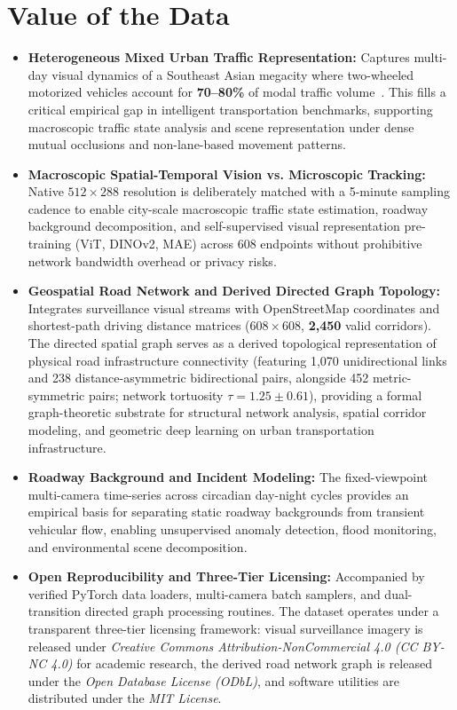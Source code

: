 \documentclass[preprint,12pt]{elsarticle}
\begin{document}
\clearpage

\clearpage

\section{Value of the Data}
\begin{itemize}
    \item \textbf{Heterogeneous Mixed Urban Traffic Representation:} Captures multi-day visual dynamics of a Southeast Asian megacity where two-wheeled motorized vehicles account for \textbf{70--80\%} of modal traffic volume~\cite{jica2014hcmc}. This fills a critical empirical gap in intelligent transportation benchmarks, supporting macroscopic traffic state analysis and scene representation under dense mutual occlusions and non-lane-based movement patterns.
    \item \textbf{Macroscopic Spatial-Temporal Vision vs. Microscopic Tracking:} Native $512 \times 288$ resolution is deliberately matched with a 5-minute sampling cadence to enable city-scale macroscopic traffic state estimation, roadway background decomposition, and self-supervised visual representation pre-training (ViT, DINOv2, MAE) across 608 endpoints without prohibitive network bandwidth overhead or privacy risks.
    \item \textbf{Geospatial Road Network and Derived Directed Graph Topology:} Integrates surveillance visual streams with OpenStreetMap coordinates and shortest-path driving distance matrices ($608 \times 608$, \textbf{2,450} valid corridors). The directed spatial graph serves as a derived topological representation of physical road infrastructure connectivity (featuring 1,070 unidirectional links and 238 distance-asymmetric bidirectional pairs, alongside 452 metric-symmetric pairs; network tortuosity $\tau = 1.25 \pm 0.61$), providing a formal graph-theoretic substrate for structural network analysis, spatial corridor modeling, and geometric deep learning on urban transportation infrastructure.
    \item \textbf{Roadway Background and Incident Modeling:} The fixed-viewpoint multi-camera time-series across circadian day-night cycles provides an empirical basis for separating static roadway backgrounds from transient vehicular flow, enabling unsupervised anomaly detection, flood monitoring, and environmental scene decomposition.
    \item \textbf{Open Reproducibility and Three-Tier Licensing:} Accompanied by verified PyTorch data loaders, multi-camera batch samplers, and dual-transition directed graph processing routines. The dataset operates under a transparent three-tier licensing framework: visual surveillance imagery is released under \textit{Creative Commons Attribution-NonCommercial 4.0 (CC BY-NC 4.0)} for academic research, the derived road network graph is released under the \textit{Open Database License (ODbL)}, and software utilities are distributed under the \textit{MIT License}.
\end{itemize}
\end{document}
